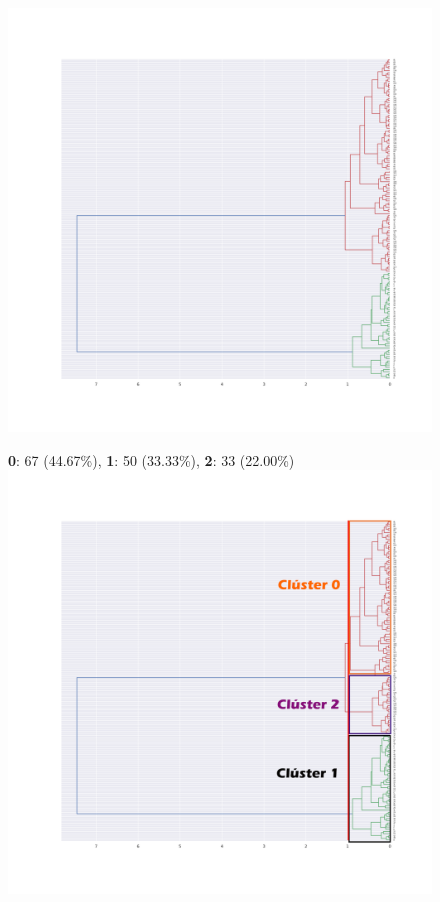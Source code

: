 \documentclass[spanish]{beamer}
\begin{document}
\begin{frame}
\begin{figure}[h]
\centering
\includegraphics[scale=0.24]{dani/dendrogramAggClusterIRIS.png}
\end{figure}
\end{frame}

\begin{frame}
\begin{figure}[h]
\centering
\textbf{0}: 67 (44.67\%), \textbf{1}: 50 (33.33\%), \textbf{2}: 33 (22.00\%)
\includegraphics[scale=0.23]{dani/dendrogramcolor.png}
\end{figure}
\end{frame}
\end{document}
